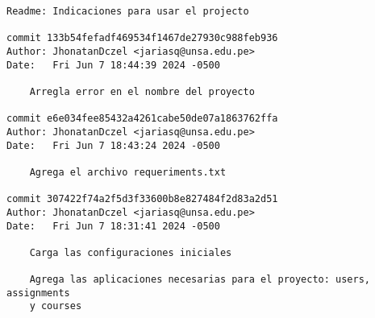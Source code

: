 \begin{Verbatim}[language=bash]
    Readme: Indicaciones para usar el projecto

commit 133b54fefadf469534f1467de27930c988feb936
Author: JhonatanDczel <jariasq@unsa.edu.pe>
Date:   Fri Jun 7 18:44:39 2024 -0500

    Arregla error en el nombre del proyecto

commit e6e034fee85432a4261cabe50de07a1863762ffa
Author: JhonatanDczel <jariasq@unsa.edu.pe>
Date:   Fri Jun 7 18:43:24 2024 -0500

    Agrega el archivo requeriments.txt

commit 307422f74a2f5d3f33600b8e827484f2d83a2d51
Author: JhonatanDczel <jariasq@unsa.edu.pe>
Date:   Fri Jun 7 18:31:41 2024 -0500

    Carga las configuraciones iniciales
    
    Agrega las aplicaciones necesarias para el proyecto: users, assignments
    y courses
\end{Verbatim}